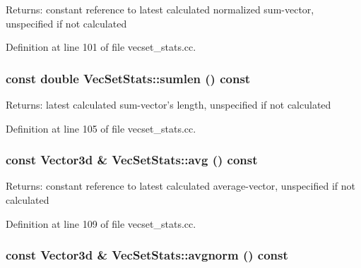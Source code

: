 \begin{Desc}
\item[Returns:]constant reference to latest calculated normalized sum-vector, unspecified if not calculated \end{Desc}


Definition at line 101 of file vecset\_\-stats.cc.\hypertarget{class_vec_set_stats_c3cb153b88e051899d7d731181bef46c}{
\subsubsection[sumlen]{\setlength{\rightskip}{0pt plus 5cm}const double VecSetStats::sumlen () const}}
\label{class_vec_set_stats_c3cb153b88e051899d7d731181bef46c}


\begin{Desc}
\item[Returns:]latest calculated sum-vector's length, unspecified if not calculated \end{Desc}


Definition at line 105 of file vecset\_\-stats.cc.\hypertarget{class_vec_set_stats_9b87664854b8b4eaf4d4a9b7ce6dd9dd}{
\subsubsection[avg]{\setlength{\rightskip}{0pt plus 5cm}const Vector3d \& VecSetStats::avg () const}}
\label{class_vec_set_stats_9b87664854b8b4eaf4d4a9b7ce6dd9dd}


\begin{Desc}
\item[Returns:]constant reference to latest calculated average-vector, unspecified if not calculated \end{Desc}


Definition at line 109 of file vecset\_\-stats.cc.\hypertarget{class_vec_set_stats_7a17760a90c4ae82919f7976df427ba2}{
\subsubsection[avgnorm]{\setlength{\rightskip}{0pt plus 5cm}const Vector3d \& VecSetStats::avgnorm () const}}
\label{class_vec_set_stats_7a17760a90c4ae82919f7976df427ba2}


